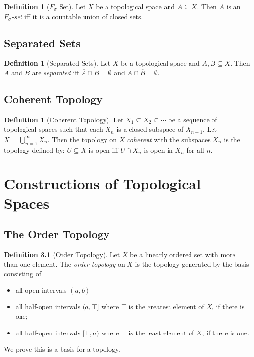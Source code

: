 \documentclass{report}
\theoremstyle{definition}
\newtheorem{df}[lm]{Definition}
\begin{document}
  \begin{df}[$F_\sigma$ Set]
    Let $X$ be a topological space and $A \subseteq X$. Then $A$ is an
    \emph{$F_\sigma$-set} iff it is a countable union of closed sets.
  \end{df}

  \section{Separated Sets}

    \begin{df}[Separated Sets]
   Let $X$ be a topological space and $A, B \subseteq X$. Then $A$ and $B$ are
   \emph{separated} iff $\overline{A} \cap B = \emptyset$ and $A \cap
   \overline{B} = \emptyset$.
  \end{df}

  \section{Coherent Topology}

   \begin{df}[Coherent Topology]
  Let $X_1 \subseteq X_2 \subseteq \cdots$ be a sequence of topological spaces
  such that each $X_n$ is a closed subspace of $X_{n+1}$. Let $X =
  \bigcup_{n=1}^\infty X_n$. Then the topology on $X$ \emph{coherent} with the
  subspaces $X_n$ is the topology defined by: $U \subseteq X$ is open iff $U
  \cap  X_n$ is open in $X_n$ for all $n$.
 \end{df}

  \chapter{Constructions of Topological Spaces}

  \section{The Order Topology}

  \begin{df}[Order Topology]
    Let $X$ be a linearly ordered set with more than one element. The
    \emph{order
      topology} on $X$ is the topology generated by the basis consisting of:
    \begin{itemize}
      \item all open intervals $(a, b)$
      \item all half-open intervals $(a, \top]$ where $\top$ is the greatest
      element of $X$, if there is one;
      \item all half-open intervals $[\bot, a)$ where $\bot$ is the least
      element of
      $X$, if there is one.
    \end{itemize}

    We prove this is a basis for a topology.
  \end{df}
\end{document}
